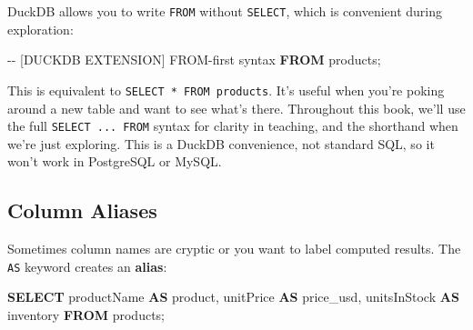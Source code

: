 \documentclass[
  letterpaper,
  DIV=11,
  numbers=noendperiod]{scrreprt}
\newenvironment{Shaded}{\begin{snugshade}}{\end{snugshade}}
\newcommand{\CommentTok}[1]{\textcolor[rgb]{0.37,0.37,0.37}{#1}}
\newcommand{\KeywordTok}[1]{\textcolor[rgb]{0.00,0.23,0.31}{\textbf{#1}}}
\newcommand{\NormalTok}[1]{\textcolor[rgb]{0.00,0.23,0.31}{#1}}
\begin{document}
\begin{tcolorbox}[enhanced jigsaw, opacitybacktitle=0.6, arc=.35mm, colback=white, bottomtitle=1mm, opacityback=0, toprule=.15mm, left=2mm, colbacktitle=quarto-callout-tip-color!10!white, breakable, coltitle=black, toptitle=1mm, colframe=quarto-callout-tip-color-frame, bottomrule=.15mm, titlerule=0mm, title=\textcolor{quarto-callout-tip-color}{\faLightbulb}\hspace{0.5em}{DuckDB's FROM-First Shorthand}, rightrule=.15mm, leftrule=.75mm]

DuckDB allows you to write \texttt{FROM} without \texttt{SELECT}, which
is convenient during exploration:

\begin{codelisting}[H]

\caption{\texttt{duckdb}}

\begin{Shaded}
\begin{Highlighting}[]
\CommentTok{{-}{-} [DUCKDB EXTENSION] FROM{-}first syntax}
\KeywordTok{FROM}\NormalTok{ products;}
\end{Highlighting}
\end{Shaded}

\end{codelisting}

This is equivalent to \texttt{SELECT\ *\ FROM\ products}. It's useful
when you're poking around a new table and want to see what's there.
Throughout this book, we'll use the full \texttt{SELECT\ ...\ FROM}
syntax for clarity in teaching, and the shorthand when we're just
exploring. This is a DuckDB convenience, not standard SQL, so it won't
work in PostgreSQL or MySQL.

\end{tcolorbox}

\subsection{Column Aliases}\label{column-aliases}

Sometimes column names are cryptic or you want to label computed
results. The \texttt{AS} keyword creates an \textbf{alias}:

\begin{codelisting}

\caption{\texttt{duckdb}}

\begin{Shaded}
\begin{Highlighting}[]
\KeywordTok{SELECT}
\NormalTok{    productName }\KeywordTok{AS}\NormalTok{ product,}
\NormalTok{    unitPrice }\KeywordTok{AS}\NormalTok{ price\_usd,}
\NormalTok{    unitsInStock }\KeywordTok{AS}\NormalTok{ inventory}
\KeywordTok{FROM}\NormalTok{ products;}
\end{Highlighting}
\end{Shaded}

\end{codelisting}
\end{document}
